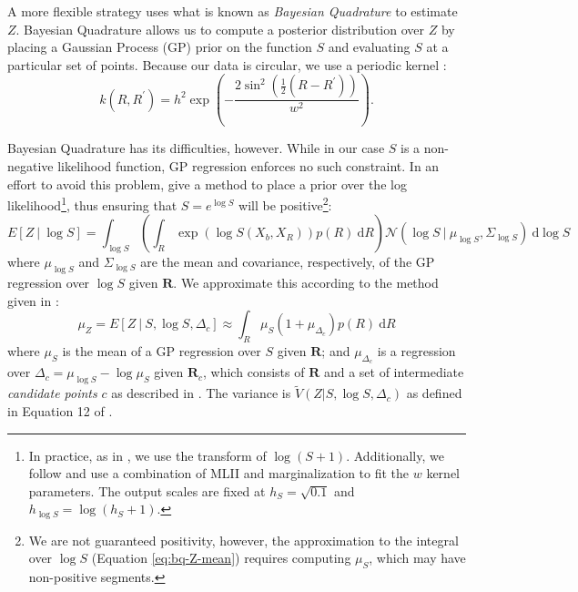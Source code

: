 \documentclass{article} %
\begin{document}
A more flexible strategy uses what is known as \emph{Bayesian
  Quadrature} \cite{Diaconis:1988uo,OHagan:1991tx} to estimate $Z$.
Bayesian Quadrature allows us to compute a posterior distribution over
$Z$ by placing a Gaussian Process (GP) prior on the function $S$ and
evaluating $S$ at a particular set of points. Because our data is
circular, we use a periodic kernel \cite{Rasmussen:2006vz}:
\begin{equation}
k(R, R^\prime)=h^2\exp\left(-\frac{2\sin^2\left(\frac{1}{2}(R-R^\prime)\right)}{w^2}\right).
\end{equation}

Bayesian Quadrature has its difficulties, however. While in our case
$S$ is a non-negative likelihood function, GP regression enforces no
such constraint. In an effort to avoid this problem,
\cite{Osborne:2012tm} give a method to place a prior over the log
likelihood\footnote{In practice, as in \cite{Osborne:2012tm}, we use
  the transform of $\log(S+1)$. Additionally, we follow
  \cite{Osborne:2012tm} and use a combination of MLII and
  marginalization to fit the $w$ kernel parameters. The output scales
  are fixed at $h_S=\sqrt{0.1}$ and $h_{\log S}=\log(h_S + 1)$.}, thus
ensuring that $S=e^{\log S}$ will be positive\footnote{We are not
  guaranteed positivity, however, the approximation to the integral
  over $\log S$ (Equation \ref{eq:bq-Z-mean}) requires computing
  $\mu_S$, which may have non-positive segments.}:
\begin{equation*}
  E[Z\ \vert \ \log S]=\int_{\log S}\left(\int_R \exp(\log{S(X_b,X_R)})p(R)\ \mathrm{d}R\right)\mathcal{N}\left(\log{S}\ \vert \ \mu_{\log S}, \Sigma_{\log S}\right)\ \mathrm{d}\log S
\end{equation*}
where $\mu_{\log S}$ and $\Sigma_{\log S}$ are the mean and
covariance, respectively, of the GP regression over $\log S$ given
$\mathbf{R}$. We approximate this according to the method given in
\cite{Osborne:2012tm}:
\begin{equation}
  \mu_Z=E[Z\ \vert \ S, \log S, \Delta_c] \approx \int_R \mu_{S}(1 + \mu_{\Delta_c}) p(R)\ \mathrm{d}R 
  \label{eq:bq-Z-mean}
\end{equation}
where $\mu_S$ is the mean of a GP regression over $S$ given
$\mathbf{R}$; and $\mu_{\Delta_c}$ is a regression over
$\Delta_c=\mu_{\log S} - \log \mu_S$ given $\mathbf{R}_c$, which
consists of $\mathbf{R}$ and a set of intermediate \emph{candidate
  points} $c$ as described in \cite{Osborne:2012tm}. The variance is
$\tilde{V}(Z\vert S, \log S, \Delta_c)$ as defined in Equation 12 of
\cite{Osborne:2012tm}.
\end{document}
